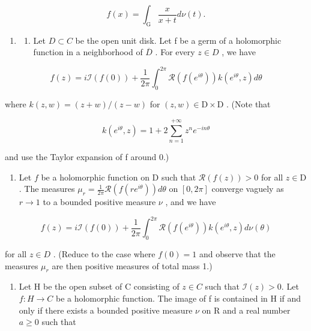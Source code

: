 \[
f (x) = \int_ {\mathrm{G}} \frac {x}{x + t} d \nu (t).
\]

\begin{enumerate}
\def\labelenumi{\arabic{enumi})}
\setcounter{enumi}{27}
\tightlist
\item
  \begin{enumerate}
  \def\labelenumii{\alph{enumii})}
  \tightlist
  \item
    Let \(D \subset C\) be the open unit disk. Let f be a germ of a holomorphic function in a neighborhood of \(\overline{D}\) . For every \(z \in D\) , we have
  \end{enumerate}
\end{enumerate}

\[
f (z) = i \mathcal {I} (f (0)) + \frac {1}{2 \pi} \int_ {0} ^ {2 \pi} \mathcal {R} (f (e ^ {i \theta})) k (e ^ {i \theta}, z) d \theta
\]

where \(k(z, w) = (z + w) / (z - w)\) for \((z, w) \in \mathrm{D} \times \mathrm{D}\) . (Note that

\[
k (e ^ {i \theta}, z) = 1 + 2 \sum_ {n = 1} ^ {+ \infty} z ^ {n} e ^ {- i n \theta}
\]

and use the Taylor expansion of f around 0.)

\begin{enumerate}
\def\labelenumi{\alph{enumi})}
\setcounter{enumi}{1}
\tightlist
\item
  Let \(f\) be a holomorphic function on D such that \(\mathcal{R}(f(z)) > 0\) for all \(z \in \mathrm{D}\) . The measures \(\mu_r = \frac{1}{2\pi} \mathcal{R}(f(re^{i\theta})) d\theta\) on \([0, 2\pi]\) converge vaguely as \(r \to 1\) to a bounded positive measure \(\nu\) , and we have
\end{enumerate}

\[
f (z) = i \mathcal {I} (f (0)) + \frac {1}{2 \pi} \int_ {0} ^ {2 \pi} \mathcal {R} (f (e ^ {i \theta})) k (e ^ {i \theta}, z) d \nu (\theta)
\]

for all \(z \in D\) . (Reduce to the case where \(f(0) = 1\) and observe that the measures \(\mu_{r}\) are then positive measures of total mass 1.)

\begin{enumerate}
\def\labelenumi{\alph{enumi})}
\setcounter{enumi}{2}
\tightlist
\item
  Let H be the open subset of C consisting of \(z \in C\) such that \(\mathcal{I}(z) > 0\). Let \(f: H \to C\) be a holomorphic function. The image of f is contained in H if and only if there exists a bounded positive measure \(\nu\) on R and a real number \(a \geqslant 0\) such that
\end{enumerate}

